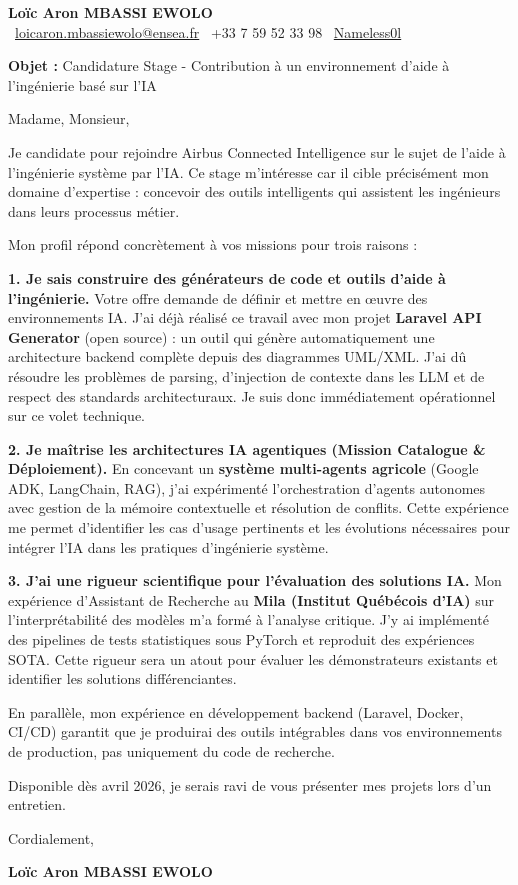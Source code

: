 \documentclass[11pt,a4paper]{article}
\begin{document}
\begin{center}
    {\Large \textbf{Loïc Aron MBASSI EWOLO}} \\
    \vspace{0.1cm}
    \small
    \faEnvelope\ \href{mailto:loicaron.mbassiewolo@ensea.fr}{loicaron.mbassiewolo@ensea.fr} \quad
    \faPhone\ +33 7 59 52 33 98 \quad
    \faGithub\ \href{https://github.com/Nameless0l}{Nameless0l}
\end{center}

\vspace{0.5cm}

\textbf{Objet :} Candidature Stage - Contribution à un environnement d'aide à l'ingénierie basé sur l'IA

Madame, Monsieur,

Je candidate pour rejoindre Airbus Connected Intelligence sur le sujet de l'aide à l'ingénierie système par l'IA. Ce stage m'intéresse car il cible précisément mon domaine d'expertise : concevoir des outils intelligents qui assistent les ingénieurs dans leurs processus métier.

Mon profil répond concrètement à vos missions pour trois raisons :

\textbf{1. Je sais construire des générateurs de code et outils d'aide à l'ingénierie.}
Votre offre demande de définir et mettre en œuvre des environnements IA. J'ai déjà réalisé ce travail avec mon projet \textbf{Laravel API Generator} (open source) : un outil qui génère automatiquement une architecture backend complète depuis des diagrammes UML/XML. J'ai dû résoudre les problèmes de parsing, d'injection de contexte dans les LLM et de respect des standards architecturaux. Je suis donc immédiatement opérationnel sur ce volet technique.

\textbf{2. Je maîtrise les architectures IA agentiques (Mission Catalogue \& Déploiement).}
En concevant un \textbf{système multi-agents agricole} (Google ADK, LangChain, RAG), j'ai expérimenté l'orchestration d'agents autonomes avec gestion de la mémoire contextuelle et résolution de conflits. Cette expérience me permet d'identifier les cas d'usage pertinents et les évolutions nécessaires pour intégrer l'IA dans les pratiques d'ingénierie système.

\textbf{3. J'ai une rigueur scientifique pour l'évaluation des solutions IA.}
Mon expérience d'Assistant de Recherche au \textbf{Mila (Institut Québécois d'IA)} sur l'interprétabilité des modèles m'a formé à l'analyse critique. J'y ai implémenté des pipelines de tests statistiques sous PyTorch et reproduit des expériences SOTA. Cette rigueur sera un atout pour évaluer les démonstrateurs existants et identifier les solutions différenciantes.

En parallèle, mon expérience en développement backend (Laravel, Docker, CI/CD) garantit que je produirai des outils intégrables dans vos environnements de production, pas uniquement du code de recherche.

Disponible dès avril 2026, je serais ravi de vous présenter mes projets lors d'un entretien.

Cordialement,

\vspace{0.5cm}

\textbf{Loïc Aron MBASSI EWOLO}
\end{document}
